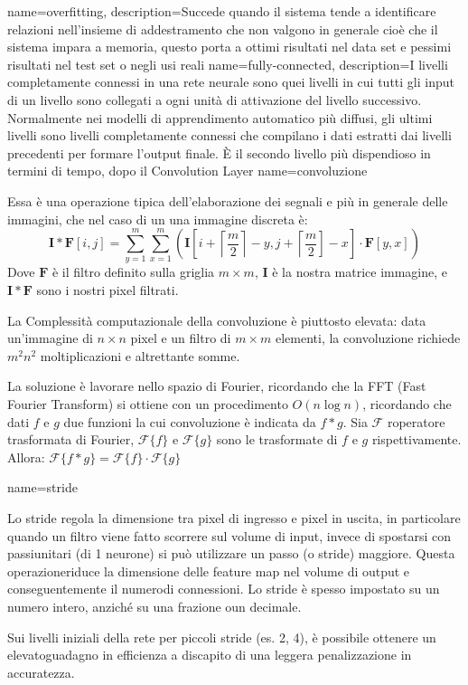 \makeglossaries

{
    name=overfitting,
    description={Succede quando il sistema tende a identificare relazioni nell’insieme di addestramento che non valgono in generale cioè che il sistema impara a memoria, questo porta a ottimi risultati nel data set e pessimi risultati nel test set o negli usi reali}
}
{
    name=fully-connected,
    description={I livelli completamente connessi in una rete neurale sono quei livelli in cui tutti gli input di
    un livello sono collegati a ogni unità di attivazione del livello successivo. Normalmente nei modelli di
    apprendimento automatico più diffusi, gli ultimi livelli sono livelli completamente connessi
    che compilano i dati estratti dai livelli precedenti per formare l’output finale. È il secondo
    livello più dispendioso in termini di tempo, dopo il Convolution Layer}
}
{
    name=convoluzione}{Essa  è una operazione tipica dell'elaborazione dei segnali e più in generale delle immagini, che nel caso di un una immagine discreta è:\[ \mathbf { I } * \mathbf{F} [ i , j ] = \sum _ { y = 1 } ^ { m } \sum _ { x = 1 } ^ { m } \left( \mathbf { I } \left[ i + \left\lceil \frac { m } { 2 } \right\rceil - y , j + \left\lceil \frac { m } { 2 } \right] - x \right] \cdot \mathbf { F } [ y , x ] \right) \]
    Dove \(\mathbf{F}\) è il filtro definito sulla griglia \(m \times m\), \(\mathbf{I}\) è la nostra matrice immagine, e \(\mathbf { I } * \mathbf{F}\) sono i nostri pixel filtrati.

    La Complessità
    computazionale  della convoluzione è 
    piuttosto elevata: data 
    un’immagine di \(n\times n\)
    pixel e un filtro di
    \(m\times m\)
    elementi, la 
    convoluzione 
    richiede \(m^2 n^2\)
    moltiplicazioni e
    altrettante somme. 
    
    La soluzione è lavorare nello spazio di Fourier, ricordando che la FFT (Fast Fourier Transform) si ottiene con un procedimento \(O(n \log n)\), ricordando che dati \( f \) e \( g \) due funzioni la cui convoluzione è indicata da \( f * g \). Sia \( \mathcal { F } \) roperatore trasformata di Fourier,  \( \mathcal { F } \{ f \} \) e \( \mathcal { F } \{ g \} \) sono le trasformate di \( f \) e \( g \) rispettivamente. Allora:
    \( \mathcal { F } \{ f * g \} = \mathcal { F } \{ f \} \cdot \mathcal { F } \{ g \} \)}

    
 {
    name=stride} {Lo stride regola la dimensione tra pixel di ingresso e pixel in uscita, in particolare quando un filtro viene fatto scorrere sul volume di input, invece di spostarsi con passiunitari (di 1 neurone) si può utilizzare un passo (o stride) maggiore. Questa operazioneriduce la dimensione delle feature map nel volume di output e conseguentemente il numerodi connessioni. Lo stride è spesso impostato su un numero intero, anziché su una frazione oun decimale.
    
    Sui livelli iniziali della rete per piccoli stride (es. 2, 4), è possibile ottenere un elevatoguadagno in eﬀicienza a discapito di una leggera penalizzazione in accuratezza.}

